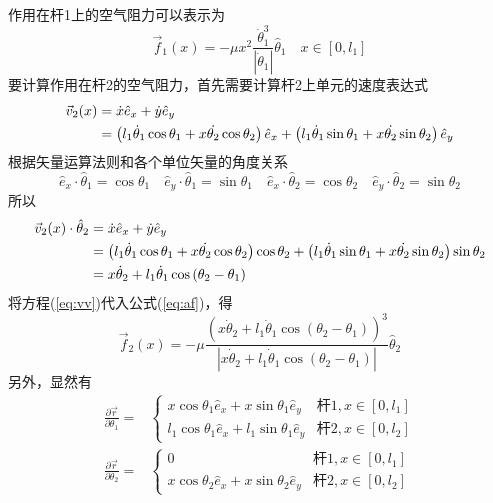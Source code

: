 \documentclass[a4paper,12pt,titlepage]{article}
\begin{document}
作用在杆1上的空气阻力可以表示为
\begin{equation}
\label{eq:af11}
	\vec{f}_1(x)=-\mu x^2 \frac{\dot{\theta}_1^3}{|\dot{\theta}_1|}\hat{\theta}_1\quad x\in [0,l_1]
\end{equation}
要计算作用在杆2的空气阻力，首先需要计算杆2上单元的速度表达式
\begin{align}
	\vec{v}_2(x)&=\dot{x}\hat{e}_x+\dot{y}\hat{e}_y \notag \\
	&=\left(l_1\dot{\theta}_1\cos{\theta_1}+x\dot{\theta_2}\cos{\theta_2} \right)\hat{e}_x+\left(l_1\dot{\theta}_1\sin{\theta_1}+x\dot{\theta_2}\sin{\theta_2} \right)\hat{e}_y
\end{align}
根据矢量运算法则和各个单位矢量的角度关系
\begin{equation}
	\hat{e}_x\cdot\hat{\theta}_1=\cos{\theta}_1 \quad
	\hat{e}_y\cdot\hat{\theta}_1=\sin{\theta}_1	\quad
	\hat{e}_x\cdot\hat{\theta}_2=\cos{\theta}_2 \quad
	\hat{e}_y\cdot\hat{\theta}_2=\sin{\theta}_2
\end{equation}
所以
\begin{align}
\label{eq:vv}
	\vec{v}_2(x)\cdot\hat{\theta}_2&=\dot{x}\hat{e}_x+\dot{y}\hat{e}_y \notag \\
	&=\left(l_1\dot{\theta}_1\cos{\theta_1}+x\dot{\theta_2}\cos{\theta_2} \right)\cos{\theta}_2+\left(l_1\dot{\theta}_1\sin{\theta_1}+x\dot{\theta_2}\sin{\theta_2} \right)\sin{\theta}_2 \notag \\
	&=x\dot{\theta}_2+l_1\dot{\theta}_1\cos{(\theta_2-\theta_1)}
\end{align}
将方程(\ref{eq:vv})代入公式(\ref{eq:af})，得
\begin{equation}
\label{eq:af21}
	\vec{f}_2(x)=-\mu\frac{(x\dot{\theta}_2+l_1\dot{\theta}_1\cos{(\theta_2-\theta_1)})^3}{|x\dot{\theta}_2+l_1\dot{\theta}_1\cos{(\theta_2-\theta_1)}|}\hat{\theta}_2
\end{equation}
另外，显然有
\begin{align}
\label{eq:af12}
	\frac{\partial \vec{r}}{\partial \theta_1}=&\begin{cases}
		x\cos{\theta_1}\hat{e}_x+x\sin{\theta_1}\hat{e}_y & \text{杆1},x\in[0,l_1] \\
		l_1\cos{\theta_1}\hat{e}_x+l_1\sin{\theta_1}\hat{e}_y & \text{杆2},x\in[0,l_2]
	\end{cases}\\
\label{eq:af22}
	\frac{\partial \vec{r}}{\partial \theta_2}=&\begin{cases}
		0 & \text{杆1},x\in[0,l_1] \\
		x\cos{\theta_2}\hat{e}_x+x\sin{\theta_2}\hat{e}_y & \text{杆2},x\in[0,l_2]
	\end{cases}
\end{align}
\end{document}
